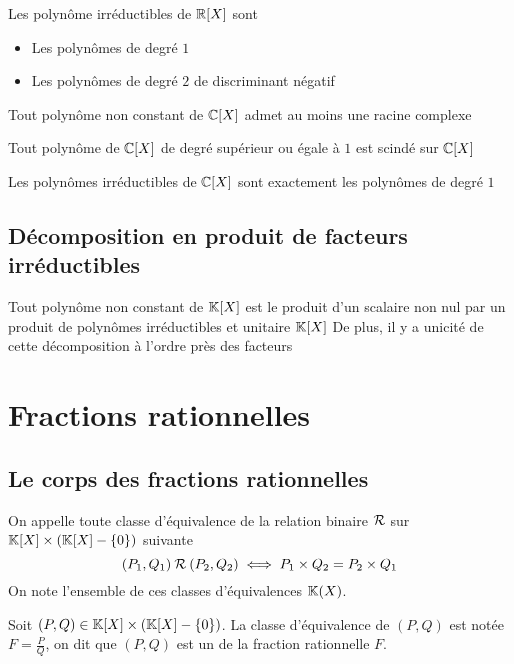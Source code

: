 \begin{thm}
Les polynôme irréductibles de $\mathbb{R}[X]$ sont
\begin{itemize}
    \item Les polynômes de degré $1$
    \item Les polynômes de degré $2$ de discriminant négatif
\end{itemize}
\end{thm}

\begin{thm}
Tout polynôme non constant de $\mathbb{C}[X]$ admet au moins une racine complexe
\end{thm}

\begin{prp}
Tout polynôme de $\mathbb{C}[X]$ de degré supérieur ou égale à $1$ est scindé
sur $\mathbb{C}[X]$
\end{prp}

\begin{prp}
Les polynômes irréductibles de $\mathbb{C}[X]$ sont exactement les polynômes
de degré $1$
\end{prp}

\subsection{Décomposition en produit de facteurs irréductibles}

\begin{thm}
Tout polynôme non constant de $\mathbb{K}[X]$ est le produit d'un scalaire
non nul par un produit de polynômes irréductibles et unitaire $\mathbb{K}[X]$
De plus, il y a unicité de cette décomposition à l'ordre près des
facteurs
\end{thm}

\section{Fractions rationnelles}

\subsection{Le corps des fractions rationnelles}

\begin{dfn}
  On appelle  toute
  classe d'équivalence de la relation binaire $\mathbin{\mathcal{R}}$ sur $\mathbb{K}[X] \times (\mathbb{K}[X] - \{0\})$
  suivante
  \[
    (P_1, Q_1) \mathbin{\mathcal{R}} (P_2, Q_2) \iff P_1 \times Q_2 = P_2 \times Q_1
  \]
  On note l'ensemble de ces classes d'équivalences $\mathbb{K}(X)$.

  Soit $(P, Q) \in \mathbb{K}[X] \times (\mathbb{K}[X] - \{0\})$. La classe d'équivalence
  de $(P, Q)$ est notée $F = \frac{P}{Q}$, on dit que $(P, Q)$ est un
   de la fraction rationnelle $F$.
\end{dfn}


